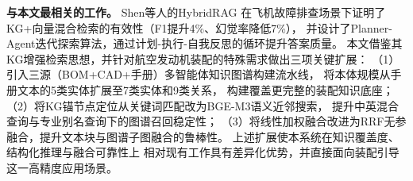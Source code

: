 \textbf{与本文最相关的工作。}
Shen等人\cite{shen2025hybridrag}的HybridRAG
在飞机故障排查场景下证明了KG+向量混合检索的有效性（F1提升4\%、幻觉率降低7\%），
并设计了Planner-Agent迭代探索算法，通过计划-执行-自我反思的循环提升答案质量。
本文借鉴其KG增强检索思想，并针对航空发动机装配的特殊需求做出三项关键扩展：
（1）引入三源（BOM+CAD+手册）多智能体知识图谱构建流水线，
将本体规模从手册文本的5类实体扩展至7类实体和9类关系，
构建覆盖更完整的装配知识底座；
（2）将KG锚节点定位从关键词匹配改为BGE-M3语义近邻搜索，
提升中英混合查询与专业别名查询下的图谱召回稳定性；
（3）将线性加权融合改进为RRF无参融合，提升文本块与图谱子图融合的鲁棒性。
上述扩展使本系统在知识覆盖度、结构化推理与融合可靠性上
相对现有工作具有差异化优势，并直接面向装配引导这一高精度应用场景。
